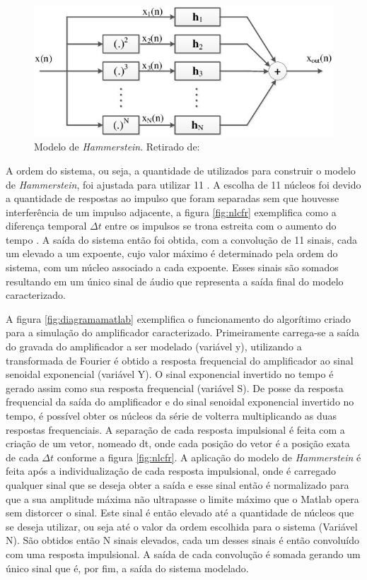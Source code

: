 \begin{figure}
	\centering
	\includegraphics[width=0.5\linewidth]{figuras/hammer}
	\caption{Modelo de \textit{Hammerstein}. Retirado de: \cite{inproceedings}}
	\label{fig:hammer}
\end{figure}

\pagebreak
A ordem do sistema, ou seja, a quantidade de  utilizados para construir o modelo de \textit{Hammerstein}, foi ajustada para utilizar 11 . A escolha de 11 núcleos foi devido a quantidade de respostas ao impulso que foram separadas sem que houvesse interferência de um impulso adjacente, a figura \ref{fig:nlcfr} exemplifica como a diferença temporal $\Delta t$ entre os impulsos se trona estreita com o aumento do tempo . A saída do sistema então foi obtida, com a convolução de 11 sinais, cada um elevado a um expoente, cujo valor máximo é determinado pela ordem do sistema, com um núcleo associado a cada expoente. Esses sinais são somados resultando em um único sinal de áudio que representa a saída final do modelo caracterizado. 

A figura \ref{fig:diagramamatlab} exemplifica o funcionamento do algorítimo criado para a simulação do amplificador caracterizado. Primeiramente carrega-se a saída do gravada do amplificador a ser modelado (variável y), utilizando a transformada de Fourier é obtido a resposta frequencial do amplificador ao sinal senoidal exponencial (variável Y). O sinal exponencial invertido no tempo é gerado assim como sua resposta frequencial (variável S). De posse da resposta frequencial da saída do amplificador e do sinal senoidal exponencial invertido no tempo, é possível obter os núcleos da série de volterra multiplicando as duas respostas frequenciais. A separação de cada resposta impulsional é feita com a criação de um vetor, nomeado dt, onde cada posição do vetor é a posição exata de cada $\Delta t$ conforme a figura \ref{fig:nlcfr}. A aplicação do modelo de \textit{Hammerstein} é feita após a individualização de cada resposta impulsional, onde é carregado qualquer sinal que se deseja obter a saída e esse sinal então é normalizado para que a sua amplitude máxima não ultrapasse o limite máximo que o Matlab opera sem distorcer o sinal. Este sinal é então elevado até a quantidade de núcleos que se deseja utilizar, ou seja até o valor da ordem escolhida para o sistema (Variável N). São obtidos então N sinais elevados, cada um desses sinais é então convoluído com uma resposta impulsional. A saída de cada convolução é somada gerando um único sinal que é, por fim, a saída do sistema modelado.


